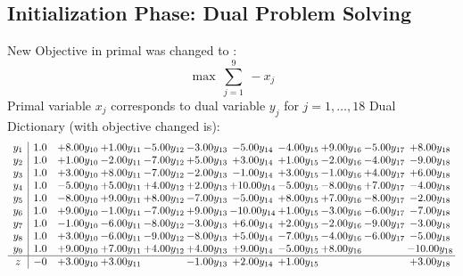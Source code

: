 \documentclass[9pt]{article}
\begin{document}
\subsection{Initialization Phase: Dual Problem Solving}
New Objective in primal was changed to : \[ \max\ \sum_{j=1}^{9}\ - x_j \] 
Primal variable $x_j$ corresponds to dual variable $y_j$ for $j = 1,\ldots,18$
Dual Dictionary (with objective changed is): 
\[\begin{array}{c| c c@{\hskip 2pt} c@{\hskip 2pt} c@{\hskip 2pt} c@{\hskip 2pt} c@{\hskip 2pt} c@{\hskip 2pt} c@{\hskip 2pt} c@{\hskip 2pt} c@{\hskip 2pt} }
 y_{1}   &  1.0 & +  8.00 y_{10} & +  1.00 y_{11} & -5.00 y_{12} & -3.00 y_{13} & -5.00 y_{14} & -4.00 y_{15} & +  9.00 y_{16} & -5.00 y_{17} & +  8.00 y_{18}\\
 y_{2}   &  1.0 & +  1.00 y_{10} & -2.00 y_{11} & -7.00 y_{12} & +  5.00 y_{13} & +  3.00 y_{14} & +  1.00 y_{15} & -2.00 y_{16} & -4.00 y_{17} & -9.00 y_{18}\\
 y_{3}   &  1.0 & +  3.00 y_{10} & +  8.00 y_{11} & -7.00 y_{12} & -2.00 y_{13} & -1.00 y_{14} & +  3.00 y_{15} & -1.00 y_{16} & +  4.00 y_{17} & +  6.00 y_{18}\\
 y_{4}   &  1.0 & -5.00 y_{10} & +  5.00 y_{11} & +  4.00 y_{12} & +  2.00 y_{13} & + 10.00 y_{14} & -5.00 y_{15} & -8.00 y_{16} & +  7.00 y_{17} & -4.00 y_{18}\\
 y_{5}   &  1.0 & -8.00 y_{10} & +  9.00 y_{11} & +  8.00 y_{12} & -7.00 y_{13} & -5.00 y_{14} & +  8.00 y_{15} & +  7.00 y_{16} & -8.00 y_{17} & -2.00 y_{18}\\
 y_{6}   &  1.0 & +  9.00 y_{10} & -1.00 y_{11} & -7.00 y_{12} & +  9.00 y_{13} & -10.00 y_{14} & +  1.00 y_{15} & -3.00 y_{16} & -6.00 y_{17} & -7.00 y_{18}\\
 y_{7}   &  1.0 & -1.00 y_{10} & -6.00 y_{11} & -8.00 y_{12} & -3.00 y_{13} & +  6.00 y_{14} & +  2.00 y_{15} & -2.00 y_{16} & -9.00 y_{17} & -3.00 y_{18}\\
 y_{8}   &  1.0 & +  3.00 y_{10} & -6.00 y_{11} & -9.00 y_{12} & -8.00 y_{13} & +  5.00 y_{14} & -7.00 y_{15} & -4.00 y_{16} & -6.00 y_{17} & -5.00 y_{18}\\
 y_{9}   &  1.0 & +  9.00 y_{10} & +  7.00 y_{11} & +  4.00 y_{12} & +  4.00 y_{13} & +  9.00 y_{14} & -5.00 y_{15} & +  8.00 y_{16} &   & -10.00 y_{18}\\
\hline
z    &  -0 & +  3.00 y_{10} & +  3.00 y_{11} &   & -1.00 y_{13} & +  2.00 y_{14} & +  1.00 y_{15} &    &   & +  3.00 y_{18}\\
\end{array}\]
\end{document}
